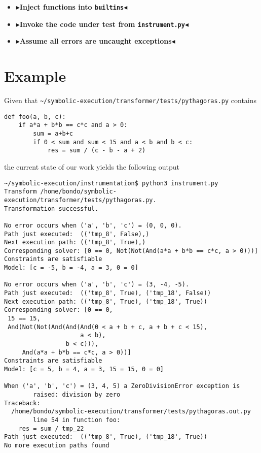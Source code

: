 \documentclass[11pt]{report}
\newcommand{\todo}[1]{{\color[rgb]{.5,0,0}\textbf{$\blacktriangleright$#1$\blacktriangleleft$}}}
\begin{document}
\begin{itemize}
\item \todo{Inject functions into \verb|builtins|}
\item \todo{Invoke the code under test from \verb|instrument.py|}
\item \todo{Assume all errors are uncaught exceptions}
\end{itemize}

\section{Example}

Given that \verb|~/symbolic-execution/transformer/tests/pythagoras.py| contains
\begin{verbatim}
def foo(a, b, c):
    if a*a + b*b == c*c and a > 0:
        sum = a+b+c
        if 0 < sum and sum < 15 and a < b and b < c:
            res = sum / (c - b - a + 2)
\end{verbatim}

the current state of our work yields the following output

\begin{verbatim}
~/symbolic-execution/instrumentation$ python3 instrument.py
Transform /home/bondo/symbolic-execution/transformer/tests/pythagoras.py.
Transformation successful.

No error occurs when ('a', 'b', 'c') = (0, 0, 0).
Path just executed:  (('tmp_8', False),)
Next execution path: (('tmp_8', True),)
Corresponding solver: [0 == 0, Not(Not(And(a*a + b*b == c*c, a > 0)))]
Constraints are satisfiable
Model: [c = -5, b = -4, a = 3, 0 = 0] 

No error occurs when ('a', 'b', 'c') = (3, -4, -5).
Path just executed:  (('tmp_8', True), ('tmp_18', False))
Next execution path: (('tmp_8', True), ('tmp_18', True))
Corresponding solver: [0 == 0,
 15 == 15,
 And(Not(Not(And(And(And(0 < a + b + c, a + b + c < 15),
                     a < b),
                 b < c))),
     And(a*a + b*b == c*c, a > 0))]
Constraints are satisfiable
Model: [c = 5, b = 4, a = 3, 15 = 15, 0 = 0] 

When ('a', 'b', 'c') = (3, 4, 5) a ZeroDivisionError exception is
        raised: division by zero
Traceback:
  /home/bondo/symbolic-execution/transformer/tests/pythagoras.out.py
        line 54 in function foo:
    res = sum / tmp_22
Path just executed:  (('tmp_8', True), ('tmp_18', True))
No more execution paths found
\end{verbatim}
\end{document}
